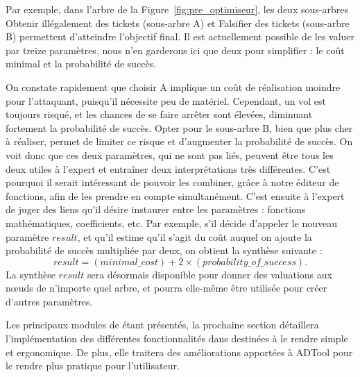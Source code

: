			Par exemple, dans l'arbre de la {\sc Figure}~\ref{fig:pre_optimiseur}, les deux sous-arbres \og Obtenir illégalement des tickets \fg{} (sous-arbre A) et \og Falsifier des tickets \fg{} (sous-arbre B) permettent d'atteindre l'objectif final. Il est actuellement possible de les valuer par treize paramètres, nous n'en garderons ici que deux pour simplifier : le coût minimal et la probabilité de succès.

			On constate rapidement que choisir A implique un coût de réalisation moindre pour l'attaquant, puisqu'il nécessite peu de matériel. Cependant, un vol est toujours risqué, et les chances de se faire arrêter sont élevées, diminuant fortement la probabilité de succès. Opter pour le sous-arbre B, bien que plus cher à réaliser, permet de limiter ce risque et d'augmenter la probabilité de succès. On voit donc que ces deux paramètres, qui ne sont pas liés, peuvent être tous les deux utiles à l'expert et entraîner deux interprétations très différentes. C'est pourquoi il serait intéressant de pouvoir les combiner, grâce à notre éditeur de fonctions, afin de les prendre en compte simultanément. C'est ensuite à l'expert de juger des liens qu'il désire instaurer entre les paramètres : fonctions mathématiques, coefficients, etc. Par exemple, s'il décide d'appeler le nouveau paramètre $result$, et qu'il estime qu'il s'agit du coût auquel on ajoute la probabilité de succès multipliée par deux, on obtient la synthèse suivante : \[ result = (minimal\_cost) + 2 \times (probability\_of\_success).\]
			La synthèse $result$ sera désormais disponible pour donner des valuations aux nœuds de n'importe quel arbre, et pourra elle-même être utilisée pour créer d'autres paramètres.

			Les principaux modules de \glasir{} étant présentés, la prochaine section détaillera l'implémentation des différentes fonctionnalités dans \glasir{} destinées à le rendre simple et ergonomique. De plus, elle traitera des améliorations apportées à ADTool pour le rendre plus pratique pour l'utilisateur.
